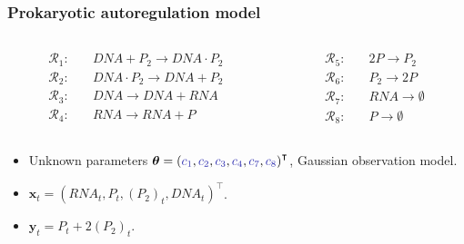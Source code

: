 \documentclass{beamer}
\newcommand{\bx}{\bm{x}}
\newcommand{\by}{\bm{y}}
\newcommand{\btheta}{\bm{\theta}}
\begin{document}
    \begin{frame}
    \frametitle{Prokaryotic autoregulation model}
    \begin{columns}
        \begin{column}{0.4\textwidth}
            \begin{equation*}
            \begin{split}
            \mathcal{R}_1:\quad & \mathit{DNA} + P_2 \to \mathit{DNA} \cdot P_2 \\
            \mathcal{R}_2:\quad & \mathit{DNA} \cdot P_2 \to \mathit{DNA} + P_2 \\
            \mathcal{R}_3:\quad & \mathit{DNA} \to \mathit{DNA} + \mathit{RNA} \\
            \mathcal{R}_4:\quad & \mathit{RNA} \to \mathit{RNA} + P
            \end{split}
            \end{equation*}
        \end{column}
%
        \begin{column}{0.4\textwidth}
            \begin{equation*}
            \begin{split}
            \mathcal{R}_5:\quad & 2P \to P_2 \\
            \mathcal{R}_6:\quad & P_2 \to 2P \\
            \mathcal{R}_7:\quad & \mathit{RNA} \to \emptyset \\
            \mathcal{R}_8:\quad & P \to \emptyset
            \end{split}
            \end{equation*}
        \end{column}
    \end{columns}

    \begin{itemize}
        \item Unknown parameters $\btheta = \left(\textcolor[RGB]{51,51,178}{c_1}, \textcolor[RGB]{51,51,178}{c_2}, \textcolor[RGB]{51,51,178}{c_3}, \textcolor[RGB]{51,51,178}{c_4}, \textcolor[RGB]{51,51,178}{c_7}, \textcolor[RGB]{51,51,178}{c_8}\right)^\intercal$, Gaussian observation model.
        \item $\bx_t = \left(\mathit{RNA}_t, P_t, \left(P_2\right)_t, \mathit{DNA}_t\right)^\intercal$.
        \item $\by_t = P_t + 2(P_2)_t$.
    \end{itemize}
    \end{frame}
\end{document}
